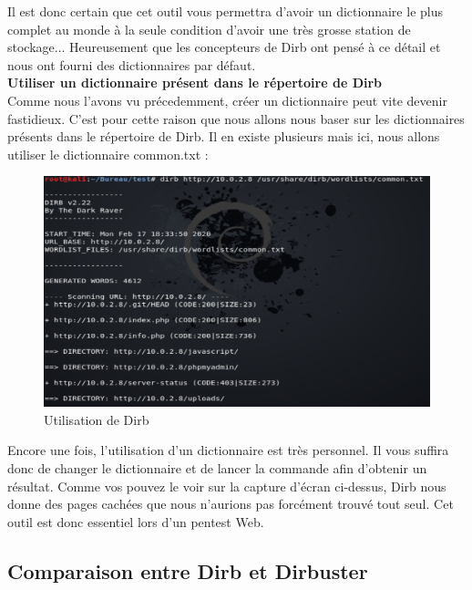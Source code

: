 Il est donc certain que cet outil vous permettra d'avoir un dictionnaire le plus complet au monde à la seule condition d'avoir une très grosse station de stockage... Heureusement que les concepteurs de Dirb ont pensé à ce détail et nous ont fourni des dictionnaires par défaut.\\

 \textbf{Utiliser un dictionnaire présent dans le répertoire de Dirb}\\

Comme nous l'avons vu précedemment, créer un dictionnaire peut vite devenir fastidieux. C'est pour cette raison que nous allons nous baser sur les dictionnaires présents dans le répertoire de Dirb. Il en existe plusieurs mais ici, nous allons utiliser le dictionnaire common.txt :

\begin{figure}[htp!]
  \centering
  \setlength\figureheight{7cm}
  \setlength\figurewidth{9cm}
  \includegraphics[width=1\textwidth]{oui/images/Dirb/dirb.PNG}
  \caption{Utilisation de Dirb}
  \label{fig:courbe-tikz}
\end{figure}

Encore une fois, l'utilisation d'un dictionnaire est très personnel. Il vous suffira donc de changer le dictionnaire et de lancer la commande afin d'obtenir un résultat. Comme vos pouvez le voir sur la capture d'écran ci-dessus, Dirb nous donne des pages cachées que nous n'aurions pas forcément trouvé tout seul. Cet outil est donc essentiel lors d'un pentest Web.

\subsection{Comparaison entre Dirb et Dirbuster}

